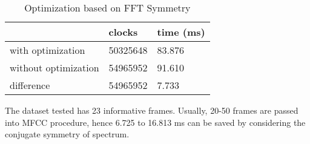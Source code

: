 \begin{table}[H]
\centering
\caption{Optimization based on FFT Symmetry}
\begin{tabu} to \textwidth {XXX}
\toprule
&clocks &time (ms)\\
\hline
with optimization &50325648 &83.876\\
\hline
without optimization &54965952 &91.610\\
\hline
difference &54965952 &7.733\\
\bottomrule
\end{tabu}
\end{table}

The dataset tested has 23 informative frames. Usually, 20-50 frames are passed into MFCC procedure, hence 6.725 to 16.813 ms can be saved by considering the conjugate symmetry of spectrum. 
